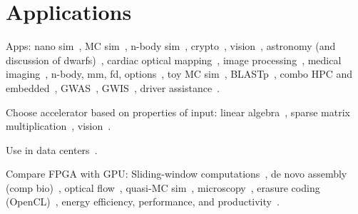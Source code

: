 \section{Applications}
\label{sec:apps}

Apps:
nano sim~\cite{khdo06},
MC sim~\cite{shsc08,tttl10},
n-body sim~\cite{tl10},
crypto~\cite{dfg+13,kl10},
vision~\cite{bkdb10,brf14},
astronomy (and discussion of dwarfs)~\cite{ibs12},
cardiac optical mapping~\cite{mjk12},
image processing~\cite{dbd+13},
medical imaging~\cite{sll13},
n-body, mm, fd, options~\cite{whk+13},
toy MC sim~\cite{admb14},
BLASTp~\cite{Papad14},
combo HPC and embedded~\cite{rpm+15},
GWAS~\cite{kws+16},
GWIS~\cite{wkhe17},
driver assistance~\cite{wlhk17}.

Choose accelerator based on properties of input:
linear algebra~\cite{sll+13},
sparse matrix multiplication~\cite{gsbh16},
vision~\cite{mfo+16}.

Use in data centers~\cite{fds+17}.

Compare FPGA with GPU: Sliding-window computations~\cite{cfbs15},
de novo assembly (comp bio)~\cite{mjk+16},
optical flow~\cite{bnw+10}, quasi-MC sim~\cite{tb10},
microscopy~\cite{tzwz15}, erasure coding (OpenCL)~\cite{czs+16},
energy efficiency, performance, and productivity~\cite{cdde13}.
